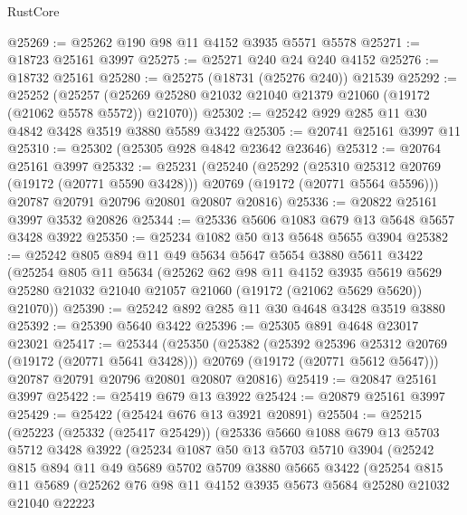 \begin{lexlean}{RustCore}
\begin{coremodule}
@25269 := @25262 @190 @98 @11 @4152 @3935 @5571 @5578
@25271 := @18723 @25161 @3997
@25275 := @25271 @240 @24 @240 @4152
@25276 := @18732 @25161
@25280 := @25275 (@18731 (@25276 @240)) @21539
@25292 := @25252
    (@25257 (@25269 @25280 @21032 @21040 @21379 @21060 (@19172 (@21062 @5578 @5572)) @21070))
@25302 := @25242 @929 @285 @11 @30 @4842 @3428 @3519 @3880 @5589 @3422
@25305 := @20741 @25161 @3997 @11
@25310 := @25302 (@25305 @928 @4842 @23642 @23646)
@25312 := @20764 @25161 @3997
@25332 := @25231
    (@25240
      (@25292
        (@25310 @25312 @20769 (@19172 (@20771 @5590 @3428)))
        @20769
        (@19172 (@20771 @5564 @5596)))
      @20787
      @20791
      @20796
      @20801
      @20807
      @20816)
@25336 := @20822 @25161 @3997 @3532 @20826
@25344 := @25336 @5606 @1083 @679 @13 @5648 @5657 @3428 @3922
@25350 := @25234 @1082 @50 @13 @5648 @5655 @3904
@25382 := @25242
    @805
    @894
    @11
    @49
    @5634
    @5647
    @5654
    @3880
    @5611
    @3422
    (@25254
      @805
      @11
      @5634
      (@25262
        @62
        @98
        @11
        @4152
        @3935
        @5619
        @5629
        @25280
        @21032
        @21040
        @21057
        @21060
        (@19172 (@21062 @5629 @5620))
        @21070))
@25390 := @25242 @892 @285 @11 @30 @4648 @3428 @3519 @3880
@25392 := @25390 @5640 @3422
@25396 := @25305 @891 @4648 @23017 @23021
@25417 := @25344
    (@25350
      (@25382
        (@25392 @25396 @25312 @20769 (@19172 (@20771 @5641 @3428)))
        @20769
        (@19172 (@20771 @5612 @5647)))
      @20787
      @20791
      @20796
      @20801
      @20807
      @20816)
@25419 := @20847 @25161 @3997
@25422 := @25419 @679 @13 @3922
@25424 := @20879 @25161 @3997
@25429 := @25422 (@25424 @676 @13 @3921 @20891)
@25504 := @25215
    (@25223
      (@25332 (@25417 @25429))
      (@25336
        @5660
        @1088
        @679
        @13
        @5703
        @5712
        @3428
        @3922
        (@25234
          @1087
          @50
          @13
          @5703
          @5710
          @3904
          (@25242
            @815
            @894
            @11
            @49
            @5689
            @5702
            @5709
            @3880
            @5665
            @3422
            (@25254
              @815
              @11
              @5689
              (@25262
                @76
                @98
                @11
                @4152
                @3935
                @5673
                @5684
                @25280
                @21032
                @21040
                @22223

\end{coremodule}
\end{lexlean}
